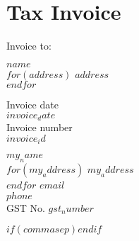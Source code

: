 \documentclass[$fontsize$, a4paper]{article}
\begin{document}
\section*{\huge \textbf{Tax Invoice} \hfill \normalfont \normalsize }
\vspace{0.5em}
Invoice to:\\
\hspace{10mm}
\begin{minipage}[t]{0.3\textwidth}
  \vspace{1pt}
  \normalsize \sffamily
  $name$\\
  $for(address)$
  $address$\\
  $endfor$
  \end{minipage}%
\begin{minipage}[t]{0.3\textwidth}
  \vspace{1mm}
  \normalsize \sffamily
  Invoice date\\
  $invoice_date$\\
  \vspace{2mm}
  Invoice number\\
  $invoice_id$\\
  \end{minipage}
\hfill
\begin{minipage}[t]{0.22\textwidth}
  \textbf{$my_name$}\\
  \normalsize
  $for(my_address)$
  $my_address$\\
  $endfor$
  \vspace{3mm}
  $email$\\
  $phone$\\
  \vspace{5mm}
  GST No. $gst_number$\\
\end{minipage}

\vspace{1em}

\normalsize

$if(commasep)$$endif$ %

\end{document}
